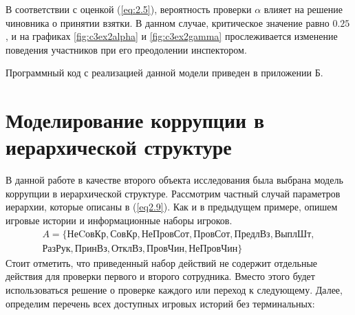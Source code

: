 \par
В соответствии с оценкой (\ref{eq:2.5}), вероятность проверки $\alpha$ влияет на решение чиновника о принятии взятки. В данном случае, критическое значение равно $0.25$, и на графиках \ref{fig:c3ex2alpha} и \ref{fig:c3ex2gamma} прослеживается изменение поведения участников при его преодолении инспектором.
\par
Программный код с реализацией данной модели приведен в приложении Б.

\section{Моделирование коррупции в иерархической структуре}

В данной работе в качестве второго объекта исследования была выбрана модель коррупции в иерархической структуре. Рассмотрим частный случай параметров иерархии, которые описаны в (\ref{eq2.9}). Как и в предыдущем примере, опишем игровые истории и информационные наборы игроков.
\begin{align*}
	A = \{\text{НеCовКр}, \text{СовКр}, \text{НеПровСот}, \text{ПровСот}, \text{ПредлВз}, \text{ВыплШт},\\ \text{РазРук}, \text{ПринВз}, \text{ОтклВз}, \text{ПровЧин}, \text{НеПровЧин} \}
\end{align*}
Стоит отметить, что приведенный набор действий не содержит отдельные действия для проверки первого и второго сотрудника. Вместо этого будет использоваться решение о проверке каждого или переход к следующему.
Далее, определим перечень всех доступных игровых историй без терминальных:

